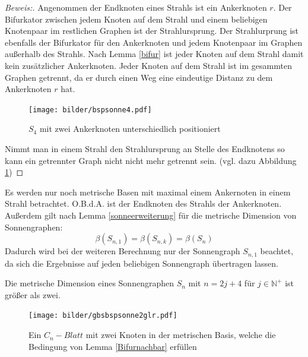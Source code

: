 \begin{proof}[Beweis:]
Angenommen der Endknoten eines Strahls ist ein Ankerknoten $r$. Der Bifurkator zwischen jedem Knoten auf dem Strahl und einem beliebigen Knotenpaar im restlichen Graphen ist der Strahlursprung. Der Strahlurprung ist ebenfalls der Bifurkator für den Ankerknoten und jedem Knotenpaar im Graphen außerhalb des Strahls. Nach Lemma \ref{bifur} ist jeder Knoten auf dem Strahl damit kein zusätzlicher Ankerknoten. Jeder Knoten auf dem Strahl ist im gesammten Graphen getrennt, da er durch einen Weg eine eindeutige Distanz zu dem Ankerknoten $r$ hat.\begin{figure}[h!]
		\centering
 		 \texttt{[image: bilder/bspsonne4.pdf]}
   \caption{$S_4$ mit zwei Ankerknoten unterschiedlich positioniert}
   \label{s4}
   \end{figure}
Nimmt man in einem Strahl den Strahlursprung an Stelle des Endknotens so kann ein getrennter Graph nicht nicht mehr getrennt sein. (vgl. dazu Abbildung \ref{s4})
\end{proof}
\begin{bem}
Es werden nur noch metrische Basen mit maximal einem Ankernoten in einem Strahl betrachtet. O.B.d.A. ist der Endknoten des Strahls der Ankerknoten. Außerdem gilt nach Lemma \ref{sonneerweiterung} für die metrische Dimension von Sonnengraphen: $$\beta(S_{n,1})=\beta(S_{n,k})=\beta(S_n)$$
Dadurch wird bei der weiteren Berechnung nur der Sonnengraph $S_{n,1}$ beachtet, da sich die Ergebnisse auf jeden beliebigen Sonnengraph übertragen lassen. 
\end{bem}
\begin{lem}
\label{mdgr2}
Die metrische Dimension eines Sonnengraphen $S_{n}$ mit $n = 2j+4$ für $j \in \mathbb{N}^+$ ist größer als zwei. 
\end{lem}
\vspace{-8mm}
 \begin{figure}[h!]
		\centering
 		 \texttt{[image: bilder/gbsbspsonne2glr.pdf]}
   \caption{Ein $C_{n}-Blatt$ mit zwei Knoten in der metrischen Basis, welche die Bedingung von Lemma \ref{Bifurnachbar} erfüllen}
  	 \end{figure}
\vspace{-4mm}
  	 ~\linebreak

